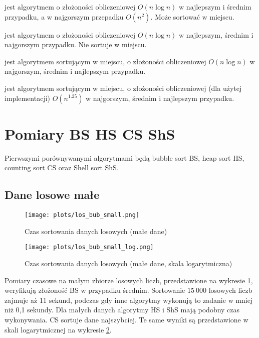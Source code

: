 \documentclass[11pt,twocolumn]{article}
\begin{document}
 jest algorytmem o złożoności obliczeniowej $O(n \log n)$ w najlepszym i średnim przypadku, a w najgorszym przepadku $O(n^2)$. Może sortować w miejscu.

 jest algorytmem o złożoności obliczeniowej $O(n \log n)$ w najlepszym, średnim i najgorszym przypadku. Nie sortuje w miejscu.

 jest algorytmem sortującym w miejscu, o złożoności obliczeniowej $O(n \log n)$ w najgorszym, średnim i najlepszym przypadku.

 jest algorytmem sortującym w miejscu, o złożoności obliczeniowej (dla użytej implementacji) $O(n^{1.25})$ w najgorszym, średnim i najlepszym przypadku.


\section{Pomiary BS HS CS ShS}

Pierwszymi porównywanymi algorytmami będą bubble sort BS, heap sort HS, counting sort CS oraz Shell sort ShS.



\subsection{Dane losowe małe}

\begin{figure}[h]
	\texttt{[image: plots/los\_bub\_small.png]}
	\caption{Czas sortowania danych losowych (małe dane) \label{losowe_male}}
\end{figure}

\begin{figure}[h]
	\texttt{[image: plots/los\_bub\_small\_log.png]}
	\caption{Czas sortowania danych losowych (małe dane, skala logarytmiczna) \label{losowe_male_log}}
\end{figure}

Pomiary czasowe na małym zbiorze losowych liczb, przedstawione na wykresie \ref{losowe_male}, weryfikują złożoność BS w przypadku średnim. Sortowanie $15\ 000$ losowych liczb zajmuje aż 11 sekund, podczas gdy inne algorytmy wykonują to zadanie w mniej niż 0,1 sekundy. Dla małych danych algorytmy HS i ShS mają podobny czas wykonywania. CS sortuje dane najszybciej. Te same wyniki są przedstawione w skali logarytmicznej na wykresie \ref{losowe_male_log}.
\end{document}

